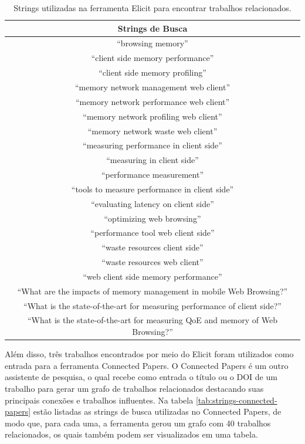 \documentclass[12pt]{tcc}
\begin{document}
	\begin{table}[H]
	\centering
	\caption{Strings utilizadas na ferramenta Elicit para encontrar trabalhos relacionados.\label{long}}
		\begin{tabular}{||c||} 
			
		\hline
			Strings de Busca \\
		\hline\hline
		``browsing memory'' \\
		``client side memory performance'' \\
		``client side memory profiling'' \\
		``memory network management web client'' \\
		``memory network performance web client'' \\
		``memory network profiling web client'' \\
		``memory network waste web client'' \\
		``measuring performance in client side'' \\
		``measuring in client side'' \\
		``performance measurement'' \\
		``tools to measure performance in client side'' \\
		``evaluating latency on client side'' \\
		``optimizing web browsing'' \\
		``performance tool web client side'' \\
		``waste resources client side'' \\
		``waste resources web client'' \\
		``web client side memory performance'' \\
		``What are the impacts of memory management in mobile Web Browsing?'' \\
		``What is the state-of-the-art for measuring performance of client side?'' \\
		``What is the state-of-the-art for measuring QoE and memory of Web Browsing?'' \\

		\hline
		\end{tabular}
	\label{tab:strings-elicit}
	\end{table}

	Além disso, três trabalhos encontrados por meio do Elicit foram utilizados como entrada para a ferramenta Connected Papers. O Connected Papers é um outro assistente de pesquisa, o qual recebe como entrada o título ou o DOI de um trabalho para gerar um grafo de trabalhos relacionados destacando suas principais conexões e trabalhos influentes.	Na tabela \ref{tab:strings-connected-papers} estão listadas as strings de busca utilizadas no Connected Papers, de modo que, para cada uma, a ferramenta gerou um grafo com 40 trabalhos relacionados, os quais também podem ser visualizados em uma tabela.
\end{document}
